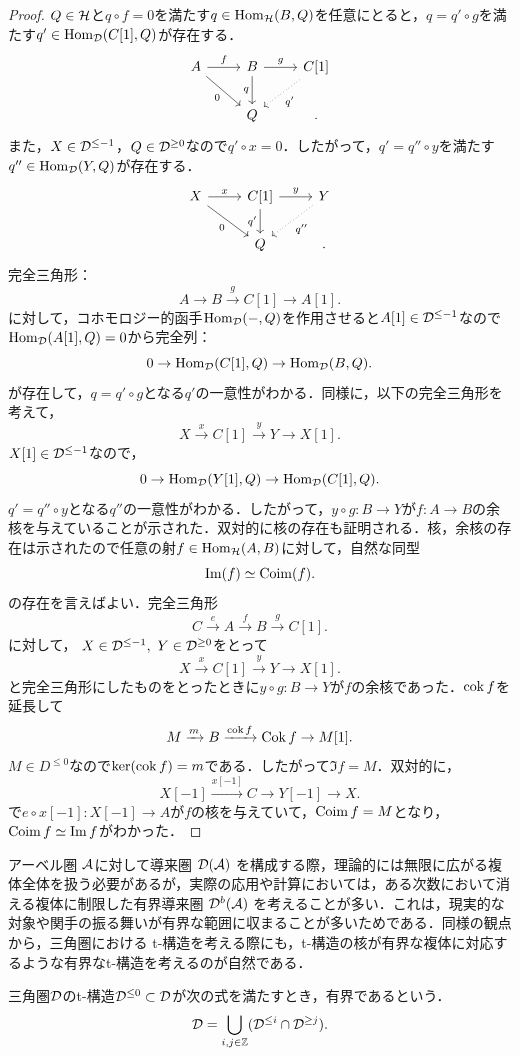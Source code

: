 \begin{proof}
	$Q\in{\mathcal H}$と$q\circ f= 0$を満たす$q\in\operatorname{\mathrm{Hom}}_{{\mathcal H}}(B,Q)$を任意にとると，$q=q'\circ g$を満たす$q'\in\operatorname{\mathrm{Hom}}_{{\mathcal D}}(C[1],Q)$が存在する．
			\[
		\begin{tikzcd}
			A\ar[r,"f"]\ar[rd,"0",swap]&B\ar[r,"g"]\ar[d,"q",swap]& C[1]\ar[ld,"q'",dotted]\\
								 &Q &.
		\end{tikzcd}
	\]
	また，$X\in{\mathcal D}^{\le -1}$，$Q\in{\mathcal D}^{\ge 0}$なので$q'\circ x=0$．したがって，$q'=q''\circ y$を満たす$q''\in\operatorname{\mathrm{Hom}}_{{\mathcal D}}(Y,Q)$が存在する．
			\[
		\begin{tikzcd}
			X\ar[r,"x"]\ar[rd,"0",swap]& C[1]\ar[r,"y"]\ar[d,"q'",swap] & Y\ar[ld,dotted,"q''"] \\
																 &Q&.
		\end{tikzcd}
	\]
	完全三角形：
	\[A\rightarrow B\xrightarrow{g} C[1]\rightarrow A[1].\]
	に対して，コホモロジー的函手$\operatorname{\mathrm{Hom}}_{{\mathcal D}}(-,Q)$を作用させると$A[1]\in{\mathcal D}^{\le -1}$なので$\operatorname{\mathrm{Hom}}_{{\mathcal D}}(A[1],Q)=0$から完全列：
	\[0\rightarrow \operatorname{\mathrm{Hom}}_{{\mathcal D}}(C[1],Q) \rightarrow \operatorname{\mathrm{Hom}}_{{\mathcal D}}(B,Q).\]
	が存在して，$q=q'\circ g$となる$q'$の一意性がわかる．同様に，以下の完全三角形を考えて，
	\[X\xrightarrow{x} C[1]\xrightarrow{y} Y\rightarrow X[1].\]
$X[1]\in{\mathcal D}^{\le -1}$なので，
	\[0\rightarrow \operatorname{\mathrm{Hom}}_{{\mathcal D}}(Y[1],Q) \rightarrow \operatorname{\mathrm{Hom}}_{{\mathcal D}}(C[1],Q).\]
	$q'=q''\circ y$となる$q''$の一意性がわかる．したがって，$y\circ g\colon B\to Y$が$f\colon A\to B$の余核を与えていることが示された．双対的に核の存在も証明される．核，余核の存在は示されたので任意の射$f\in\operatorname{\mathrm{Hom}}_{{\mathcal H}}(A,B)$に対して，自然な同型
\[\Im(f)\simeq \operatorname{\mathrm{Coim}}(f).\]
の存在を言えばよい．完全三角形
	\[C\xrightarrow{e}A\xrightarrow{f}B\xrightarrow{g}C[1].\]
	に対して， $X\in{\mathcal D}^{\le -1},\ Y\in{\mathcal D}^{\ge 0}$をとって
	\[X\xrightarrow{x}C[1]\xrightarrow{y}Y\rightarrow X[1].\]
	と完全三角形にしたものをとったときに$y\circ g\colon B\to Y$が$f$の余核であった．$\operatorname{cok} f$を延長して
	\[M\xrightarrow{m}B\xrightarrow{\operatorname{cok} f}\operatorname{Cok} f\rightarrow M[1].\]
	$M\in D^{\le 0}$なので$\ker(\operatorname{cok} f) = m$である．したがって$\Im f= M$．双対的に，
\[X[-1]\xrightarrow{x[-1]} C \rightarrow Y[-1]\rightarrow X.\]
で$e\circ x[-1]\colon X[-1]\to A$が$f$の核を与えていて，$\operatorname{\mathrm{Coim}} f = M$となり，$\operatorname{\mathrm{Coim}} f\simeq \Im f$がわかった．
\end{proof}

アーベル圏 ${\mathcal A}$に対して導来圏 ${\mathcal D}({\mathcal A})$ を構成する際，理論的には無限に広がる複体全体を扱う必要があるが，実際の応用や計算においては，ある次数において消える複体に制限した有界導来圏 ${\mathcal D}^b({\mathcal A})$ を考えることが多い．これは，現実的な対象や関手の振る舞いが有界な範囲に収まることが多いためである．同様の観点から，三角圏における t-構造を考える際にも，t-構造の核が有界な複体に対応するような有界なt-構造を考えるのが自然である．
\begin{defn}\cite{BBD}
	三角圏${\mathcal D}$のt-構造${\mathcal D}^{\le 0}\subset {\mathcal D}$が次の式を満たすとき，有界であるという．
	\[{\mathcal D} = \bigcup_{i,j\in{\mathbb Z}}({\mathcal D}^{\le i}\cap{\mathcal D}^{\ge j}).\]
\end{defn}

